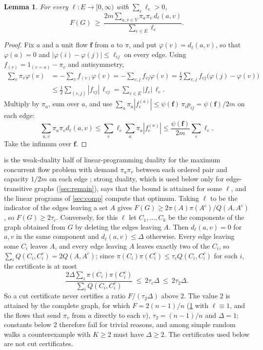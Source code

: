 \documentclass[11pt]{amsart}
\newtheorem{lemma}[theorem]{Lemma}
\theoremstyle{definition}
\newcommand{\bfF}{\mathbf{f}}
\begin{document}
\begin{lemma}\label{lem:dual}
For every $\ell:E\to[0,\infty)$ with $\sum_e\ell_e>0$,
\[
F(G)\ \ge\ \frac{2m\sum_{a,v\in V}\pi_a\pi_v\,d_\ell(a,v)}{\sum_{e\in E}\ell_e}.
\]
\end{lemma}

\begin{proof}
Fix $a$ and a unit flow $\bfF$ from $a$ to $\pi$, and put $\varphi(v)=d_\ell(a,v)$, so that $\varphi(a)=0$ and $|\varphi(i)-\varphi(j)|\le\ell_{ij}$ on every edge. Using $f_{(v)}=1_{(v=a)}-\pi_v$ and antisymmetry,
\begin{align*}
\sum_v\pi_v\varphi(v)&=-\sum_vf_{(v)}\varphi(v)=-\sum_{v,j}f_{vj}\varphi(v)=\frac12\sum_{v,j}f_{vj}\bigl(\varphi(j)-\varphi(v)\bigr)\\
&\le\frac12\sum_{(v,j)}|f_{vj}|\,\ell_{vj}=\sum_{e\in E}|f_e|\,\ell_e .
\end{align*}
Multiply by $\pi_a$, sum over $a$, and use $\sum_a\pi_a|f^{(a)}_e|\le\psi(\bfF)\,\pi_ip_{ij}=\psi(\bfF)/2m$ on each edge:
\[
\sum_{a,v}\pi_a\pi_vd_\ell(a,v)\le\sum_e\ell_e\sum_a\pi_a|f^{(a)}_e|\le\frac{\psi(\bfF)}{2m}\sum_e\ell_e .
\]
Take the infimum over $\bfF$.
\end{proof}

 is the weak-duality half of linear-programming duality for the maximum concurrent flow problem with demand $\pi_a\pi_v$ between each ordered pair and capacity $1/2m$ on each edge \cite{SM,LR}; strong duality, which is used below only for edge-transitive graphs (\cref{sec:remain}), says that the bound is attained for some $\ell$, and the linear programs of \cref{sec:comp} compute that optimum. Taking $\ell$ to be the indicator of the edges leaving a set $A$ gives $F(G)\ge2\pi(A)\pi(A^c)/Q(A,A^c)$, so $F(G)\ge2\tau_c$. Conversely, for this $\ell$ let $C_1,\dots,C_k$ be the components of the graph obtained from $G$ by deleting the edges leaving $A$. Then $d_\ell(a,v)=0$ for $a,v$ in the same component and $d_\ell(a,v)\le\Delta$ otherwise. Every edge leaving some $C_i$ leaves $A$, and every edge leaving $A$ leaves exactly two of the $C_i$, so $\sum_iQ(C_i,C_i^c)=2Q(A,A^c)$; since $\pi(C_i)\pi(C_i^c)\le\tau_cQ(C_i,C_i^c)$ for each $i$, the certificate is at most
\[
\frac{2\Delta\sum_i\pi(C_i)\pi(C_i^c)}{\sum_iQ(C_i,C_i^c)}\ \le\ 2\tau_c\Delta\ \le\ 2\tau_2\Delta .
\]
So a cut certificate never certifies a ratio $F/(\tau_2\Delta)$ above $2$. The value $2$ is attained by the complete graph, for which $F=2(n-1)/n$ (\cref{lem:dual} with $\ell\equiv1$, and the flows that send $\pi_v$ from $a$ directly to each $v$), $\tau_2=(n-1)/n$ and $\Delta=1$; constants below $2$ therefore fail for trivial reasons, and among simple random walks a counterexample with $K\ge2$ must have $\Delta\ge2$. The certificates used below are not cut certificates.
\end{document}
